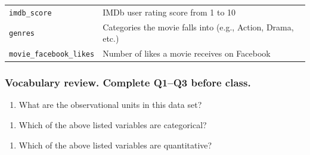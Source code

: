 \documentclass[
]{report}
\providecommand{\tightlist}{%
  \setlength{\itemsep}{0pt}\setlength{\parskip}{0pt}}
\begin{document}
\begin{longtable}[]{@{}ll@{}}
\begin{minipage}[t]{0.22\columnwidth}\raggedright
\texttt{imdb\_score}\strut
\end{minipage} & \begin{minipage}[t]{0.72\columnwidth}\raggedright
IMDb user rating score from 1 to 10\strut
\end{minipage}\tabularnewline
\begin{minipage}[t]{0.22\columnwidth}\raggedright
\texttt{genres}\strut
\end{minipage} & \begin{minipage}[t]{0.72\columnwidth}\raggedright
Categories the movie falls into (e.g., Action, Drama, etc.)\strut
\end{minipage}\tabularnewline
\begin{minipage}[t]{0.22\columnwidth}\raggedright
\texttt{movie\_facebook\_likes}\strut
\end{minipage} & \begin{minipage}[t]{0.72\columnwidth}\raggedright
Number of likes a movie receives on Facebook\strut
\end{minipage}\tabularnewline
\bottomrule
\end{longtable}

\hypertarget{vocabulary-review.-complete-q1q3-before-class.-1}{%
\subsubsection*{Vocabulary review. Complete Q1--Q3 before class.}\label{vocabulary-review.-complete-q1q3-before-class.-1}}

\begin{enumerate}
\def\labelenumi{\arabic{enumi}.}
\tightlist
\item
  What are the observational units in this data set?
\end{enumerate}

\vspace{0.1in}

\begin{enumerate}
\def\labelenumi{\arabic{enumi}.}
\setcounter{enumi}{1}
\tightlist
\item
  Which of the above listed variables are categorical?
\end{enumerate}

\vspace{.5in}

\begin{enumerate}
\def\labelenumi{\arabic{enumi}.}
\setcounter{enumi}{2}
\tightlist
\item
  Which of the above listed variables are quantitative?
\end{enumerate}
\end{document}
